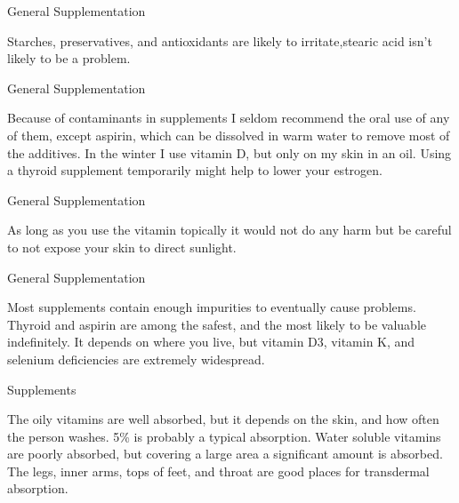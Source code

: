 \documentclass[11pt,oneside,openany,extrafontsizes]{memoir}
\begin{document}
\begin{standalonequote}{General Supplementation}

    \begin{answer}
        Starches, preservatives, and antioxidants are likely to irritate,stearic acid isn't likely to be a problem.
    \end{answer}
\end{standalonequote}

\begin{standalonequote}{General Supplementation}

    \begin{answer}
        Because of contaminants in supplements I seldom recommend the oral use of any of them, except aspirin, which can be dissolved in warm water to remove most of the additives. In the winter I use vitamin D, but only on my skin in an oil. Using a thyroid supplement temporarily might help to lower your estrogen.
    \end{answer}
\end{standalonequote}

\begin{standalonequote}{General Supplementation}

    \begin{answer}
        As long as you use the vitamin topically it would not do any harm but be careful to not expose your skin to direct sunlight.
    \end{answer}
\end{standalonequote}

\begin{standalonequote}{General Supplementation}

    \begin{answer}
        Most supplements contain enough impurities to eventually cause problems. Thyroid and aspirin are among the safest, and the most likely to be valuable indefinitely. It depends on where you live, but vitamin D3, vitamin K, and selenium deficiencies are extremely widespread.
    \end{answer}
\end{standalonequote}

\begin{standalonequote}{Supplements}

    \begin{answer}
        The oily vitamins are well absorbed, but it depends on the skin, and how often the person washes. 5\% is probably a typical absorption. Water soluble vitamins are poorly absorbed, but covering a large area a significant amount is absorbed.
The legs, inner arms, tops of feet, and throat are good places for transdermal absorption.
    \end{answer}
\end{standalonequote}
\end{document}

